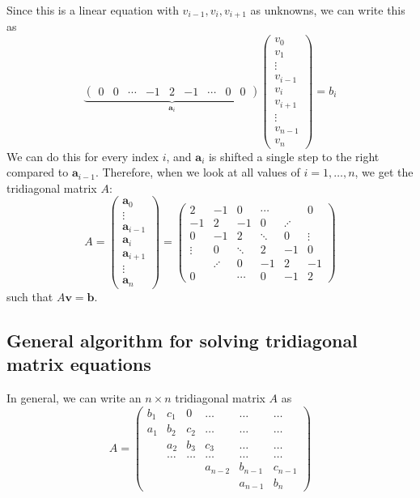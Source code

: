 \documentclass[12pt,a4paper]{article}
\newcommand\V[1]{\mathbf{#1}}                  %
\newcommand\M[1]{\begin{pmatrix} #1 \end{pmatrix}} %
\begin{document}
Since this is a linear equation with $v_{i-1},v_i,v_{i+1}$ as unknowns, we can write this as
\begin{equation}
  \underbrace{\M{ 0 & 0 & \cdots & -1 & 2 & -1 & \cdots & 0 & 0 }}_{\V{a}_i}
  \M{ v_0 \\ v_1 \\ \vdots \\ v_{i-1} \\ v_i \\ v_{i+1} \\ \vdots \\ v_{n-1} \\ v_n }
  = b_i
\end{equation}
We can do this for every index $i$, and $\V{a}_i$ is shifted a single step to the right compared to $\V{a}_{i-1}$. Therefore, when we
look at all values of $i = 1, \ldots, n$, we get the tridiagonal matrix $A$:
\begin{equation}
  A = \M{ \V{a}_0 \\ \vdots \\ \V{a}_{i-1} \\ \V{a}_i \\ \V{a}_{i+1} \\ \vdots \\ \V{a}_n }
    = \M{
      2  & -1 & 0 & \cdots &         & 0 \\
      -1 & 2  & -1 & 0 & \iddots & \\
      0 & -1 & 2  & \ddots & 0 & \vdots \\
      \vdots & 0 & \ddots & 2 & -1 & 0\\
        & \iddots & 0 & -1 & 2 & -1 \\
      0 & & \cdots & 0 & -1 & 2
    }
\end{equation}
such that $A \V{v} = \V{b}$.


\subsection{General algorithm for solving tridiagonal matrix equations}
\label{sec:b}

In general, we can write an $n \times n$ tridiagonal matrix $A$ as
\begin{equation}
  A = \M{
    b_1 & c_1 & 0 & \ldots & \ldots & \ldots \\
    a_1 & b_2 & c_2 & \ldots & \ldots & \ldots \\
    & a_2 & b_3 & c_3 & \ldots & \ldots \\
    & \ldots & \ldots & \ldots & \ldots & \ldots \\
    & & & a_{n-2} & b_{n-1} & c_{n-1} \\
    & & & & a_{n-1} & b_n
  }
\end{equation}
\end{document}
